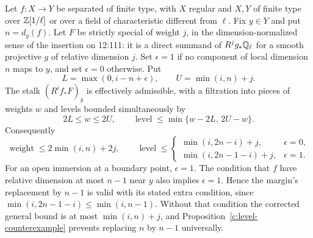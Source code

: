 \begin{theorem}
\label{c:general-level-bound}
Let $f:X\to Y$ be separated of finite type, with $X$ regular and $X,Y$ of finite type over $\mathbb Z[1/\ell]$ or over a field of characteristic different from $\ell$. Fix $y\in Y$ and put $n=d_y(f)$. Let $F$ be strictly special of weight $j$, in the dimension-normalized sense of the insertion on 12:111: it is a direct summand of $R^jg_*\mathbb Q_\ell$ for a smooth projective $g$ of relative dimension $j$. Set $\epsilon=1$ if no component of local dimension $n$ maps to $y$, and set $\epsilon=0$ otherwise. Put
\[
 L=\max(0,i-n+\epsilon),\qquad U=\min(i,n)+j.
\]
The stalk $(R^if_*F)_{\bar y}$ is effectively admissible, with a filtration into pieces of weights $w$ and levels bounded simultaneously by
\begin{equation}
\label{c:weight-level-polygon}
 2L\leq w\leq2U,
 \qquad \operatorname{level}\leq\min\{w-2L,\,2U-w\}.
\end{equation}
Consequently
\[
 \operatorname{weight}\leq2\min(i,n)+2j,
 \qquad
 \operatorname{level}\leq
 \begin{cases}
 \min(i,2n-i)+j,&\epsilon=0,\\
 \min(i,2n-1-i)+j,&\epsilon=1.
 \end{cases}
\]
For an open immersion at a boundary point, $\epsilon=1$. The condition that $f$ have relative dimension at most $n-1$ near $y$ also implies $\epsilon=1$. Hence the margin's replacement by $n-1$ is valid with its stated extra condition, since $\min(i,2n-1-i)\leq\min(i,n-1)$. Without that condition the corrected general bound is at most $\min(i,n)+j$, and Proposition~\ref{c:level-counterexample} prevents replacing $n$ by $n-1$ universally.
\end{theorem}

